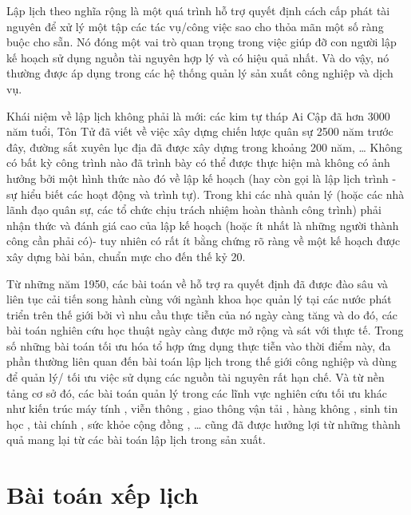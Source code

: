 \documentclass[11pt]{article}
\begin{document}
Lập lịch theo nghĩa rộng là một quá trình hỗ trợ quyết định cách cấp phát tài nguyên để xử lý một tập các tác vụ/công việc sao cho thỏa mãn một số ràng buộc cho sẵn. Nó đóng một vai trò quan trọng trong việc giúp đỡ con người lập kế hoạch sử dụng nguồn tài nguyên hợp lý và có hiệu quả nhất. Và do vậy, nó thường được áp dụng trong các hệ thống quản lý sản xuất công nghiệp và dịch vụ.

Khái niệm về lập lịch không phải là mới: các kim tự tháp Ai Cập đã hơn 3000 năm tuổi, Tôn Tử đã viết về việc xây dựng chiến lược quân sự 2500 năm trước đây, đường sắt xuyên lục địa đã được xây dựng trong khoảng 200 năm, … Không có bất kỳ công trình nào đã trình bày có thể được thực hiện mà không có ảnh hưởng bởi một hình thức nào đó về lập kế hoạch (hay còn gọi là lập lịch trình - sự hiểu biết các hoạt động và trình tự). Trong khi các nhà quản lý (hoặc các nhà lãnh đạo quân sự, các tổ chức chịu trách nhiệm hoàn thành công trình) phải nhận thức và đánh giá cao của lập kế hoạch (hoặc ít nhất là những người thành công cần phải có)- tuy nhiên có rất ít bằng chứng rõ ràng về một kế hoạch được xây dựng bài bản, chuẩn mực cho đến thế kỷ 20.

Từ những năm 1950, các bài toán về hỗ trợ ra quyết định đã được đào sâu và liên tục cải tiến song hành cùng với ngành khoa học quản lý tại các nước phát triển trên thế giới bởi vì nhu cầu thực tiễn của nó ngày càng tăng và do đó, các bài toán nghiên cứu học thuật ngày càng được mở rộng và sát với thực tế. Trong số những bài toán tối ưu hóa tổ hợp ứng dụng thực tiễn vào thời điểm này, đa phần thường liên quan đến bài toán lập lịch trong thế giới công nghiệp và dùng để quản lý/ tối ưu việc sử dụng các nguồn tài nguyên rất hạn chế. Và từ nền tảng cơ sở đó, các bài toán quản lý trong các lĩnh vực nghiên cứu tối ưu khác như kiến trúc máy tính \cite{Muchnick:Gibbons:2004}, viễn thông \cite{Lutton:al:2000}, giao thông vận tải \cite{Artiouchine:al:2008}, hàng không \cite{Artiouchine:al:2008, Baptiste:Sadykov:2010}, sinh tin học \cite{Blazewicz:al:2007}, tài chính \cite{Coffman:al:2010}, sức khỏe cộng đồng \cite{Kergosien:al:2011a, Kergosien:al:2011b}, … cũng đã được hưởng lợi từ những thành quả mang lại từ các bài toán lập lịch trong sản xuất.
 
\section{\texorpdfstring{Bài toán xếp lịch}{Scheduling/Timetabling problem}}
\end{document}
